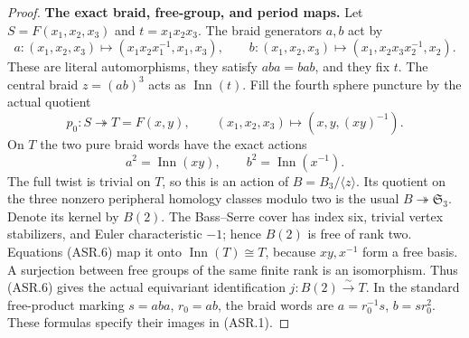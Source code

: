 \begin{proof}
\par\medskip\noindent\textbf{The exact braid, free-group, and period maps.}
Let
$S=F(x_1,x_2,x_3)$ and $t=x_1x_2x_3$.
The braid generators $a,b$ act by
\[
 a:(x_1,x_2,x_3)\longmapsto
       (x_1x_2x_1^{-1},x_1,x_3),\qquad
 b:(x_1,x_2,x_3)\longmapsto
       (x_1,x_2x_3x_2^{-1},x_2).                        \tag{ASR.4}
\]
These are literal automorphisms, they satisfy $aba=bab$, and
they fix $t$.  The central braid $z=(ab)^3$ acts as
$\operatorname{Inn}(t)$.
Fill the fourth sphere puncture by the actual quotient
\[
 p_0:S\twoheadrightarrow T=F(x,y),\qquad
 (x_1,x_2,x_3)\longmapsto
                (x,y,(xy)^{-1}).                       \tag{ASR.5}
\]
On $T$ the two pure braid words have the exact actions
\[
 a^2=\operatorname{Inn}(xy),\qquad
 b^2=\operatorname{Inn}(x^{-1}).                        \tag{ASR.6}
\]
The full twist is trivial on $T$, so this is an action of
$B=B_3/\langle z\rangle$.
Its quotient on the three nonzero peripheral homology classes
modulo two is the usual $B\twoheadrightarrow\mathfrak S_3$.
Denote its kernel by $B(2)$.
The Bass--Serre cover has index six, trivial vertex stabilizers,
and Euler characteristic $-1$; hence $B(2)$ is free of rank two.
Equations (ASR.6) map it onto $\operatorname{Inn}(T)\cong T$,
because $xy,x^{-1}$ form a free basis.
A surjection between free groups of the same finite rank is an
isomorphism.  Thus (ASR.6) gives the actual equivariant
identification
$j:B(2)\xrightarrow{\sim}T$.
In the standard free-product marking $s=aba$, $r_0=ab$,
the braid words are $a=r_0^{-1}s$, $b=sr_0^2$.
These formulas specify their images in (ASR.1).


\end{proof}
